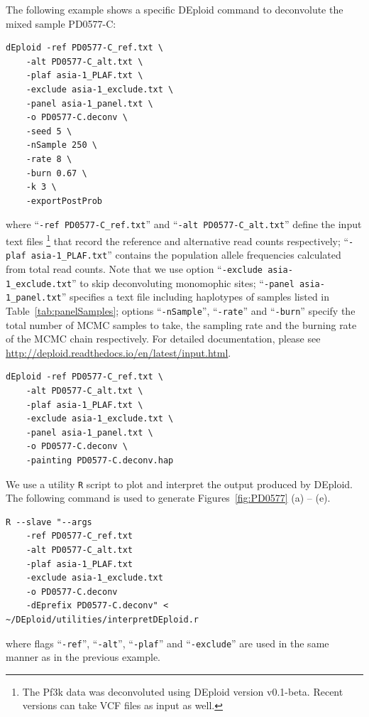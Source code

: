 \documentclass{article}
\begin{document}
The following example shows a specific {\textmd DEploid} command to deconvolute the mixed sample {\textmd PD0577-C}:
\linespread{1}
\begin{lstlisting}
dEploid -ref PD0577-C_ref.txt \
    -alt PD0577-C_alt.txt \
    -plaf asia-1_PLAF.txt \
    -exclude asia-1_exclude.txt \
    -panel asia-1_panel.txt \
    -o PD0577-C.deconv \
    -seed 5 \
    -nSample 250 \
    -rate 8 \
    -burn 0.67 \
    -k 3 \
    -exportPostProb
\end{lstlisting}
\linespread{1.5}
where ``{\tt -ref PD0577-C\_ref.txt}'' and ``{\tt -alt PD0577-C\_alt.txt}'' define the input text files \footnote{The Pf3k data was deconvoluted using DEploid version v0.1-beta. Recent versions can take VCF files as input as well.} that record the reference and alternative read counts respectively; ``{\tt -plaf asia-1\_PLAF.txt}'' contains the population allele frequencies calculated from total read counts. Note that we use option ``{\tt -exclude asia-1\_exclude.txt}'' to skip deconvoluting monomophic sites; ``{\tt -panel asia-1\_panel.txt}'' specifies a text file including haplotypes of samples listed in Table~\ref{tab:panelSamples}; options ``{\tt -nSample}'', ``{\tt -rate}'' and ``{\tt -burn}'' specify the total number of MCMC samples to take, the sampling rate and the burning rate of the MCMC chain respectively. For detailed documentation, please see \url{http://deploid.readthedocs.io/en/latest/input.html}.

\linespread{1}
\begin{lstlisting}
dEploid -ref PD0577-C_ref.txt \
    -alt PD0577-C_alt.txt \
    -plaf asia-1_PLAF.txt \
    -exclude asia-1_exclude.txt \
    -panel asia-1_panel.txt \
    -o PD0577-C.deconv \
    -painting PD0577-C.deconv.hap
\end{lstlisting}
\linespread{1.5}



We use a utility {\tt R} script to plot and interpret the output produced by DEploid. The following command is used to generate Figures~\ref{fig:PD0577} (a) -- (e).
\linespread{1}
\begin{lstlisting}
R --slave "--args
    -ref PD0577-C_ref.txt
    -alt PD0577-C_alt.txt
    -plaf asia-1_PLAF.txt
    -exclude asia-1_exclude.txt
    -o PD0577-C.deconv
    -dEprefix PD0577-C.deconv" < ~/DEploid/utilities/interpretDEploid.r
\end{lstlisting}
\linespread{1.5}
where flags ``{\tt -ref}'', ``{\tt -alt}'', ``{\tt -plaf}'' and ``{\tt -exclude}'' are used in the same manner as in the previous example.
\end{document}
